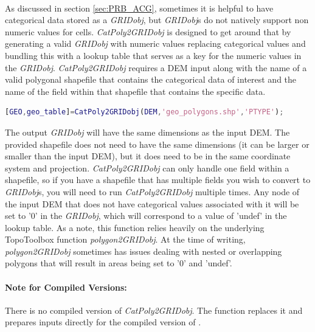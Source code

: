 \paragraph{}As discussed in section \ref{sec:PRB_ACG}, sometimes it is helpful to have categorical data stored as a \textit{GRIDobj}, but \textit{GRIDobj}s  do not natively support non numeric values for cells. \textit{CatPoly2GRIDobj} is designed to get around that by generating a valid \textit{GRIDobj} with numeric values replacing categorical values and bundling this with a lookup table that serves as a key for the numeric values in the \textit{GRIDobj}. \textit{CatPoly2GRIDobj} requires a DEM input along with the name of a valid polygonal shapefile that contains the categorical data of interest and the name of the field within that shapefile that contains the specific data. 

\begin{lstlisting}[language=Matlab]
% Generate a categorical grid and lookup table for a geologic map for the rock type field with the name 'PTYPE' in the input shapefile
[GEO,geo_table]=CatPoly2GRIDobj(DEM,'geo_polygons.shp','PTYPE');
\end{lstlisting}

\noindent
The output \textit{GRIDobj} will have the same dimensions as the input DEM. The provided shapefile does not need to have the same dimensions (it can be larger or smaller than the input DEM), but it does need to be in the same coordinate system and projection.  \textit{CatPoly2GRIDobj} can only handle one field within a shapefile, so if you have a shapefile that has multiple fields you wish to convert to \textit{GRIDobj}s, you will need to run \textit{CatPoly2GRIDobj} multiple times. Any node of the input DEM that does not have categorical values associated with it will be set to '0' in the \textit{GRIDobj}, which will correspond to a value of 'undef' in the lookup table. As a note, this function relies heavily on the underlying TopoToolbox function \textit{polygon2GRIDobj}. At the time of writing, \textit{polygon2GRIDobj} sometimes has issues dealing with nested or overlapping polygons that will result in areas being set to '0' and 'undef'.

\paragraph{Note for Compiled Versions:} There is no compiled version of \textit{CatPoly2GRIDobj}. The  function replaces it and prepares inputs directly for the compiled version of .

